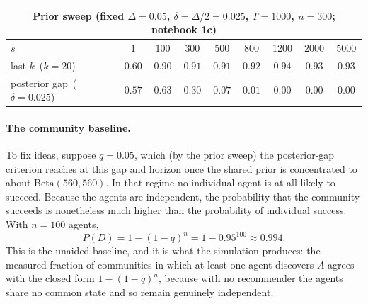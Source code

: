 \documentclass[12pt]{article}
\begin{document}
\begin{center}
\small
\begin{tabular}{lcccccccc}
\toprule
\multicolumn{9}{c}{\textbf{Prior sweep} \quad (fixed $\Delta = 0.05$, $\delta = \Delta/2 = 0.025$, $T = 1000$, $n = 300$; notebook 1c)}\\
\midrule
$s$ & $1$ & $100$ & $300$ & $500$ & $800$ & $1200$ & $2000$ & $5000$\\
\midrule
last-$k$ \,($k = 20$) & $0.60$ & $0.90$ & $0.91$ & $0.91$ & $0.92$ & $0.94$ & $0.93$ & $0.93$\\
posterior gap \,($\delta = 0.025$) & $0.57$ & $0.63$ & $0.30$ & $0.07$ & $0.01$ & $0.00$ & $0.00$ & $0.00$\\
\bottomrule
\end{tabular}
\end{center}

\paragraph{The community baseline.}
To fix ideas, suppose $q = 0.05$, which (by the prior sweep) the posterior-gap criterion reaches at this gap and horizon once the shared prior is concentrated to about $\mathrm{Beta}(560,560)$. In that regime no individual agent is at all likely to succeed. Because the agents are independent, the probability that the community succeeds is nonetheless much higher than the probability of individual success. With $n = 100$ agents,
\[
  P(D) = 1 - (1-q)^n = 1 - 0.95^{100} \approx 0.994.
\]
This is the unaided baseline, and it is what the simulation produces: the measured fraction of communities in which at least one agent discovers $A$ agrees with the closed form $1 - (1-\hat q)^n$, because with no recommender the agents share no common state and so remain genuinely independent.
\end{document}
